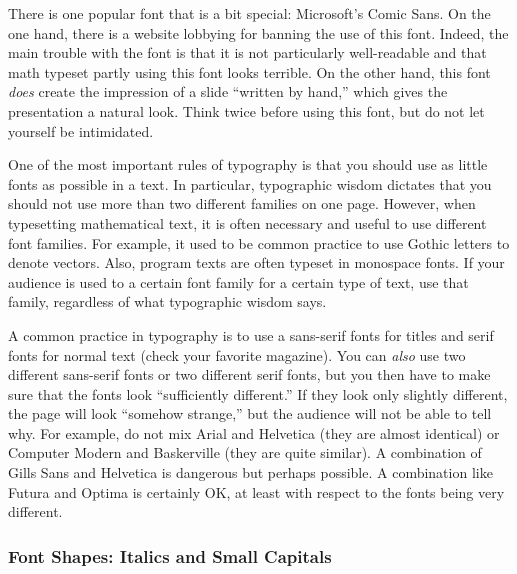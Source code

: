 There is one popular font that is a bit special: Microsoft's Comic Sans. On the one hand, there is a website lobbying for banning the use of this font. Indeed, the main trouble with the font is that it is not particularly well-readable and that math typeset partly using this font looks terrible. On the other hand, this font \emph{does} create the impression of a slide ``written by hand,'' which gives the presentation a natural look. Think twice before using this font, but do not let yourself be intimidated.

One of the most important rules of typography is that you should use as little fonts as possible in a text. In particular, typographic wisdom dictates that you should not use more than two different families on one page. However, when typesetting mathematical text, it is often necessary and useful to use different font families. For example, it used to be common practice to use Gothic letters to denote vectors. Also, program texts are often typeset in monospace fonts. If your audience is used to a certain font family for a certain type of text, use that family, regardless of what typographic wisdom says.

A common practice in typography is to use a sans-serif fonts for titles and serif fonts for normal text (check your favorite magazine). You can \emph{also} use two different sans-serif fonts or two different serif fonts, but you then have to make sure that the fonts look ``sufficiently different.'' If they look only slightly different, the page will look ``somehow strange,'' but the audience will not be able to tell why. For example, do not mix Arial and Helvetica (they are almost identical) or Computer Modern and Baskerville (they are quite similar). A combination of Gills Sans and Helvetica is dangerous but perhaps possible. A combination like Futura and Optima is certainly OK, at least with respect to the fonts being very different.

\subsubsection{Font Shapes: Italics and Small Capitals}
\label{section-italics}
\label{section-smallcaps}

